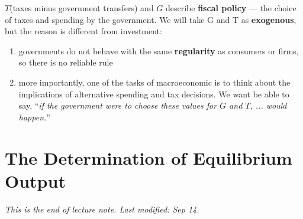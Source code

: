\documentclass[11pt, a4paper]{ECON2123}
\begin{document}
\begin{spacing}{1.5}
    $T$(taxes minus government transfers) and $G$ 
    describe {\bf fiscal policy} — the choice of taxes and spending by the 
    government. We will take G and T as {\bf exogenous}, but the reason is 
    different from investment: 
    \begin{enumerate}
        \item governments do not behave with the same {\bf regularity} as consumers 
        or firms, so there is no reliable rule
        \item more importantly, one of the tasks of macroeconomic is to think 
        about the implications of alternative spending and tax decisions. 
        We want be able to say, ``{\it if the government were to choose these 
        values for $G$ and $T$, ... would happen.}''
    \end{enumerate}

    \section{The Determination of Equilibrium Output}




    {\it This is the end of lecture note. Last modified: Sep 14.}

\end{spacing}
\end{document}
